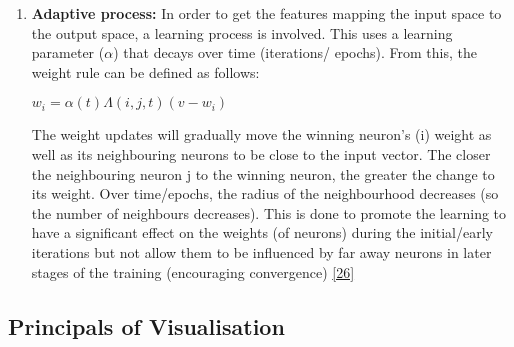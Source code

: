 \begin{enumerate}
        
\item \textbf{Adaptive process: }
        In order to get the features mapping the input space to the output space, a learning process is involved. This uses a learning parameter ($\alpha$) that decays over time (iterations/ epochs). From this, the weight rule can be defined as follows:
        
        \begin{center}
    
        $ w_{i} = \alpha (t) \Lambda (i, j, t) (v - w_{i})$
        
         \end{center}
       
       The weight updates will gradually move the winning neuron's (i) weight as well as its neighbouring neurons to be close to the input vector. The closer the neighbouring neuron j to the winning neuron, the greater the change to its weight. Over time/epochs, the radius of the neighbourhood decreases (so the number of neighbours decreases). This is done to promote the learning to have a significant effect on the weights (of neurons) during the initial/early iterations but not allow them to be  influenced by far away neurons in later stages of the training (encouraging convergence) \hyperlink{26}{[26]}
       
\end{enumerate}

\subsection{Principals of Visualisation}

